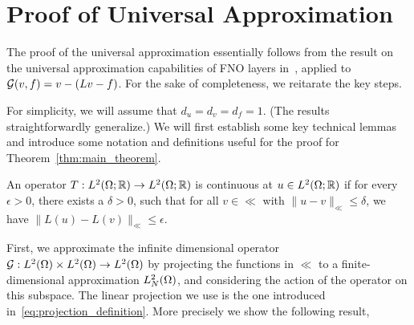 \section{Proof of Universal Approximation}
\label{sec:proof_of_universal_approximation}

The proof of the universal approximation essentially follows from the result on the universal approximation 
capabilities of FNO layers in~\citet{kovachki2021universal}, applied to $\mathcal{G}(v,f) = v - (Lv - f)$. For the sake of completeness, we reitarate the key steps.  

For simplicity, we will assume that 
$d_u = d_v = d_f = 1$. (The results straightforwardly generalize.)
We will first establish some key technical lemmas and introduce some notation and definitions useful 
for the proof for Theorem~\ref{thm:main_theorem}.

\begin{definition}
    An operator $T: L^2(\Omega; \mathbb{R}) \to L^2(\Omega; \mathbb{R})$
    is continuous 
    at $u \in L^2(\Omega; \mathbb{R})$ if for every 
    $\epsilon > 0$, there exists a $\delta > 0$,
    such that for all $v \in \ll$ with $\|u - v\|_{\ll}\leq\delta$,
    we have 
    $\|L(u) - L(v)\|_{\ll} \leq \epsilon$.
\end{definition}









First, we approximate the infinite dimensional operator $\mathcal{G}: L^2(\Omega) \times L^2(\Omega) \to L^2(\Omega)$
by projecting the functions in $\ll$ to a finite-dimensional approximation $L^2_N(\Omega)$, and considering the action of the operator on this subspace.  
The linear projection we use is the one introduced in~\eqref{eq:projection_definition}.
More precisely we show the following result, 

